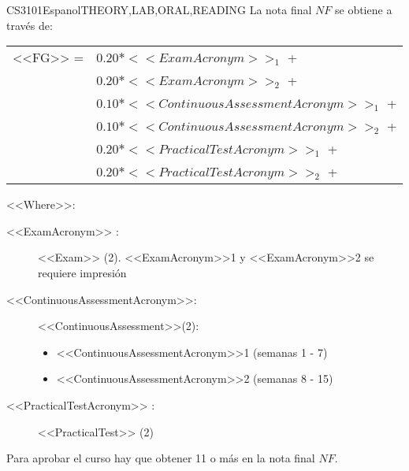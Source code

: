   \begin{evaluation}{CS3101}{Espanol}{THEORY,LAB,ORAL,READING}
  La nota final $NF$ se obtiene a través de: \\
 
  \begin{tabular}{cl}
    <<FG>> =  & $0.20*<<ExamAcronym>>_{1}$ +\\
              & $0.20*<<ExamAcronym>>_{2}$ +\\
              & $0.10*<<ContinuousAssessmentAcronym>>_{1}$ +  \\
              & $0.10*<<ContinuousAssessmentAcronym>>_{2}$ + \\
              & $0.20*<<PracticalTestAcronym>>_{1}$ +\\
              & $0.20*<<PracticalTestAcronym>>_{2}$ +\\
  \end{tabular}

  \noindent <<Where>>:
  \begin{description}
         \item[<<ExamAcronym>> :] <<Exam>> (2). <<ExamAcronym>>1 y <<ExamAcronym>>2  se requiere impresión
         \item[<<ContinuousAssessmentAcronym>>:]<<ContinuousAssessment>>(2):
             \begin{itemize}
                \item <<ContinuousAssessmentAcronym>>1 (semanas 1 - 7) 
                 \item <<ContinuousAssessmentAcronym>>2 (semanas 8 - 15)
             \end{itemize}
    \item[<<PracticalTestAcronym>> :] <<PracticalTest>> (2)
  \end{description}
 
  \noindent Para aprobar el curso hay que obtener 11 o más en la nota final $NF$.
  \end{evaluation}

